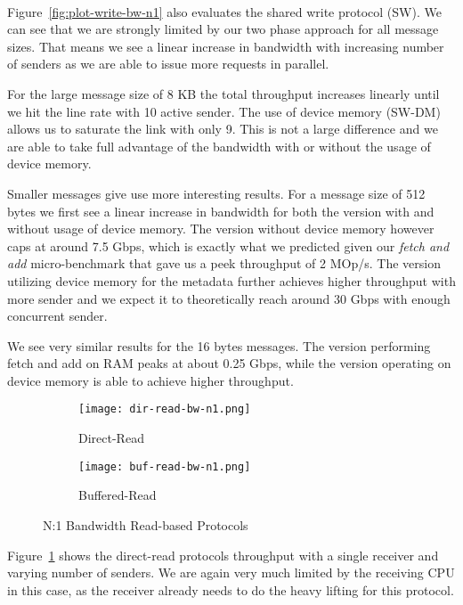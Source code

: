 \paragraph{} Figure~\ref{fig:plot-write-bw-n1} also evaluates the shared write protocol (SW). We can see that we are strongly limited
by our two phase approach for all message sizes. That means we see a linear increase in bandwidth with increasing number of 
senders as we are able to issue more requests in parallel.

For the large message size of 8 KB the total throughput increases linearly until we hit the line rate with 10 
active sender. The use of device memory \mbox{(SW-DM)} allows us to saturate the link with only 9. This is not a 
large difference and we are able to take full advantage of the bandwidth with or without the usage of device memory.

Smaller messages give use more interesting results. For a message size of 512 bytes we first see a linear 
increase in bandwidth for both the version with and without usage of device memory. The version without device memory however
caps at around 7.5 Gbps, which is exactly what we predicted given our \emph{fetch and add} micro-benchmark that gave us a
peek throughput of 2 MOp/s. The version utilizing device memory for the metadata further achieves higher throughput with more
sender and we expect it to theoretically reach around 30 Gbps with enough concurrent sender.

We see very similar results for the 16 bytes messages. The version performing fetch and add on RAM peaks at about 0.25 Gbps, 
while the version operating on device memory is able to achieve higher throughput.



\begin{figure}[ht]
  \begin{subfigure}[b]{0.49\textwidth}
  \centering
  \texttt{[image: dir-read-bw-n1.png]}
  \caption{Direct-Read}
  \label{fig:plot-dirread-bw-n1}
  \end{subfigure}
  \begin{subfigure}[b]{0.49\textwidth}
  \centering
  \texttt{[image: buf-read-bw-n1.png]}
  \caption{Buffered-Read}
  \label{fig:plot-bufread-bw-n1}
  \end{subfigure}
  \caption{N:1 Bandwidth Read-based Protocols}
\end{figure}

Figure~\ref{fig:plot-dirread-bw-n1} shows the direct-read protocols throughput with a single receiver and varying number of senders.
We are again very much limited by the receiving CPU in this case, as the receiver already needs to do the heavy lifting for 
this protocol. 

